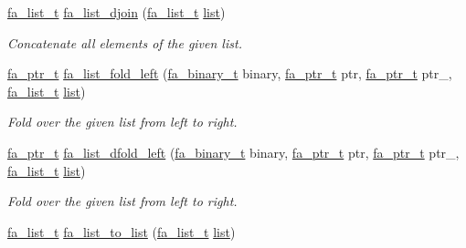 \begin{DoxyCompactItemize}
\hyperlink{group___fa_list_ga35ecb12ab934ded0cce0bcf28e3bc5d2}{fa\-\_\-list\-\_\-t} \hyperlink{group___fa_list_ga746d2a947920478dbeaaa1675e17c2f8}{fa\-\_\-list\-\_\-djoin} (\hyperlink{group___fa_list_ga35ecb12ab934ded0cce0bcf28e3bc5d2}{fa\-\_\-list\-\_\-t} \hyperlink{literals_8h_a4ddd63dfcfec2b4d5741a56aa6003c76}{list})
\begin{DoxyCompactList}\small\item\em Concatenate all elements of the given list. \end{DoxyCompactList}\item 
\hyperlink{group___fa_ga915ddeae99ad7568b273d2b876425197}{fa\-\_\-ptr\-\_\-t} \hyperlink{group___fa_list_gacea56824c646fa7657ab5b7c455a15ed}{fa\-\_\-list\-\_\-fold\-\_\-left} (\hyperlink{group___fa_gab70ba406935a18c1d645d12e7abf2e63}{fa\-\_\-binary\-\_\-t} binary, \hyperlink{group___fa_ga915ddeae99ad7568b273d2b876425197}{fa\-\_\-ptr\-\_\-t} ptr, \hyperlink{group___fa_ga915ddeae99ad7568b273d2b876425197}{fa\-\_\-ptr\-\_\-t} ptr\-\_\-, \hyperlink{group___fa_list_ga35ecb12ab934ded0cce0bcf28e3bc5d2}{fa\-\_\-list\-\_\-t} \hyperlink{literals_8h_a4ddd63dfcfec2b4d5741a56aa6003c76}{list})
\begin{DoxyCompactList}\small\item\em Fold over the given list from left to right. \end{DoxyCompactList}\item 
\hyperlink{group___fa_ga915ddeae99ad7568b273d2b876425197}{fa\-\_\-ptr\-\_\-t} \hyperlink{group___fa_list_gac08d7401e20be33be4e2f1985be35a95}{fa\-\_\-list\-\_\-dfold\-\_\-left} (\hyperlink{group___fa_gab70ba406935a18c1d645d12e7abf2e63}{fa\-\_\-binary\-\_\-t} binary, \hyperlink{group___fa_ga915ddeae99ad7568b273d2b876425197}{fa\-\_\-ptr\-\_\-t} ptr, \hyperlink{group___fa_ga915ddeae99ad7568b273d2b876425197}{fa\-\_\-ptr\-\_\-t} ptr\-\_\-, \hyperlink{group___fa_list_ga35ecb12ab934ded0cce0bcf28e3bc5d2}{fa\-\_\-list\-\_\-t} \hyperlink{literals_8h_a4ddd63dfcfec2b4d5741a56aa6003c76}{list})
\begin{DoxyCompactList}\small\item\em Fold over the given list from left to right. \end{DoxyCompactList}\item 
\hyperlink{group___fa_list_ga35ecb12ab934ded0cce0bcf28e3bc5d2}{fa\-\_\-list\-\_\-t} \hyperlink{group___fa_list_ga80860daae8583099d5ad10cb01d0b5a0}{fa\-\_\-list\-\_\-to\-\_\-list} (\hyperlink{group___fa_list_ga35ecb12ab934ded0cce0bcf28e3bc5d2}{fa\-\_\-list\-\_\-t} \hyperlink{literals_8h_a4ddd63dfcfec2b4d5741a56aa6003c76}{list})
\end{DoxyCompactItemize}


